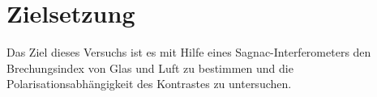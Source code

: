 \section{Zielsetzung}
\label{sec:Zielsetzung}
Das Ziel dieses Versuchs ist es mit Hilfe eines Sagnac-Interferometers 
den Brechungsindex von Glas und Luft zu bestimmen 
und die Polarisationsabhängigkeit des Kontrastes zu untersuchen.
